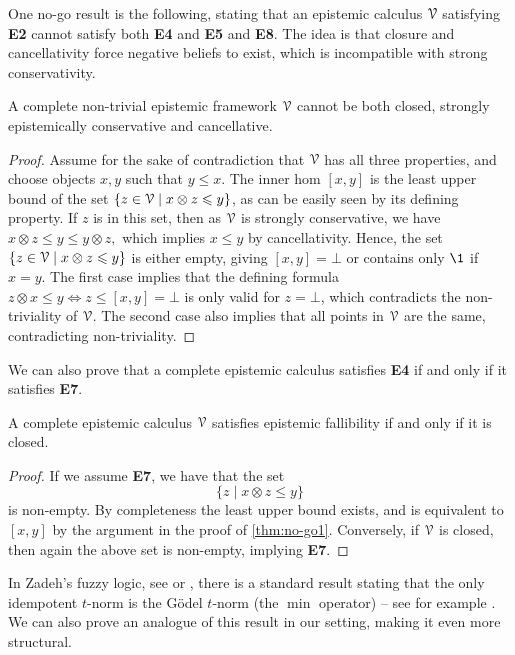 One no-go result is the following, stating that an epistemic calculus $\EuScript{V}$ satisfying \textbf{E2} cannot satisfy both \textbf{E4} and \textbf{E5} and \textbf{E8}. The idea is that closure and cancellativity force negative beliefs to exist, which is incompatible with strong conservativity. 

\begin{theorem}
    \label{thm:no-go1}
    A complete non-trivial epistemic framework $\EuScript{V}$ cannot be both closed, strongly epistemically conservative and cancellative. 
\end{theorem}
\begin{proof}
    Assume for the sake of contradiction that $\EuScript{V}$ has all three properties, and choose objects $x,y$ such that $y \leq x$. The inner hom $[x,y]$ is the least upper bound of the set $\{z\in \EuScript{V} \mid x\otimes z \leqslant y\}$, as can be easily seen by its defining property. If $z$ is in this set, then as $\EuScript{V}$ is strongly conservative, we have 
    $x\otimes z \leq y \leq y\otimes z,$
    which implies $x\leq y$ by cancellativity. Hence, the set $\{z\in \EuScript{V} \mid x\otimes z \leqslant y\}$ is either empty, giving $[x,y] = \bot$ or contains only $\1$ if $x=y$. The first case implies that the defining formula $z\otimes x \leq y \iff z\leq [x,y] = \bot$ is only valid for $z = \bot$, which contradicts the non-triviality of $\EuScript{V}$. The second case also implies that all points in $\EuScript{V}$ are the same, contradicting non-triviality.
\end{proof}

We can also prove that a complete epistemic calculus satisfies \textbf{E4} if and only if it satisfies \textbf{E7}. 

\begin{theorem}
    A complete epistemic calculus $\EuScript{V}$ satisfies epistemic fallibility if and only if it is closed. 
\end{theorem}
\begin{proof}
    If we assume \textbf{E7}, we have that the set 
    \[\{z \mid x\otimes z \leq y\}\] 
    is non-empty. By completeness the least upper bound exists, and is equivalent to $[x,y]$ by the argument in the proof of \cref{thm:no-go1}. Conversely, if $\EuScript{V}$ is closed, then again the above set is non-empty, implying \textbf{E7}. 
\end{proof}

In Zadeh's fuzzy logic, see \cite{zadeh_1965} or \cite{klir-yuan_1995}, there is a standard result stating that the only idempotent $t$-norm is the Gödel $t$-norm (the $\min$ operator) -- see for example \cite[3.3]{dudek-jun_1999}. We can also prove an analogue of this result in our setting, making it even more structural. 

